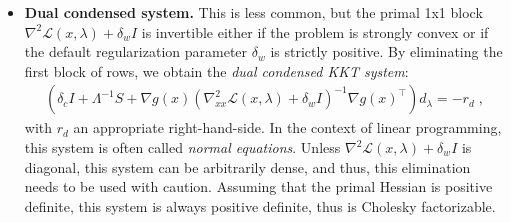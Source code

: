 \documentclass{article}
\begin{document}
\begin{itemize}[leftmargin=*,itemsep=0pt,parsep=0pt,partopsep=0pt]
\item \textbf{Dual condensed system.}
This is less common, but the primal 1x1 block $\nabla^2 \mathcal{L}(x,\lambda) + \delta_w I$ is invertible either if the problem is strongly convex or if the default regularization parameter $\delta_w$ is strictly positive.
By eliminating the first block of rows, we obtain the \emph{dual condensed KKT system}:
\begin{align}\label{eqn:kkt_dual}
  \left(\delta_c I + \Lambda^{-1}S + \nabla g(x)\left(\nabla_{x x}^2 \mathcal{L}(x,\lambda) + \delta_w I\right)^{-1} \nabla g(x)^\top\right)
  d_\lambda = - r_d \; ,
\end{align}
with $r_d$ an appropriate right-hand-side.
In the context of linear programming, this system is often called \emph{normal equations}.
Unless $\nabla^2 \mathcal{L}(x,\lambda) + \delta_w I$ is diagonal, this system can be arbitrarily dense, and thus, this elimination needs to be used with caution. Assuming that the primal Hessian is positive definite, this system is always positive definite, thus is Cholesky factorizable.
\end{itemize}
\end{document}
